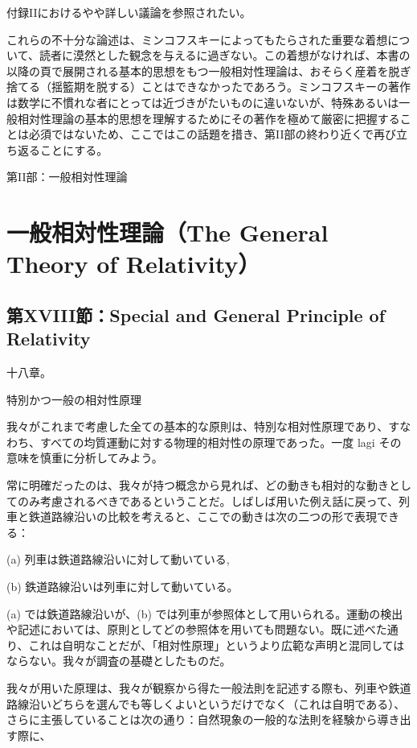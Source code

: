 \documentclass[a4paper,11pt,openany]{ltjsbook}
\begin{document}
 付録IIにおけるやや詳しい議論を参照されたい。

これらの不十分な論述は、ミンコフスキーによってもたらされた重要な着想について、読者に漠然とした観念を与えるに過ぎない。この着想がなければ、本書の以降の頁で展開される基本的思想をもつ一般相対性理論は、おそらく産着を脱ぎ捨てる（揺籃期を脱する）ことはできなかったであろう。ミンコフスキーの著作は数学に不慣れな者にとっては近づきがたいものに違いないが、特殊あるいは一般相対性理論の基本的思想を理解するためにその著作を極めて厳密に把握することは必須ではないため、ここではこの話題を措き、第II部の終わり近くで再び立ち返ることにする。

第II部：一般相対性理論


\clearpage
\part{一般相対性理論（The General Theory of Relativity）}



\clearpage
\chapter{第XVIII節：Special and General Principle of Relativity}

十八章。

特別かつ一般の相対性原理

我々がこれまで考慮した全ての基本的な原則は、特別な相対性原理であり、すなわち、すべての均質運動に対する物理的相対性の原理であった。一度 lagi その意味を慎重に分析してみよう。

常に明確だったのは、我々が持つ概念から見れば、どの動きも相対的な動きとしてのみ考慮されるべきであるということだ。しばしば用いた例え話に戻って、列車と鉄道路線沿いの比較を考えると、ここでの動きは次の二つの形で表現できる：

(a) 列車は鉄道路線沿いに対して動いている,

(b) 鉄道路線沿いは列車に対して動いている。

(a) では鉄道路線沿いが、(b) では列車が参照体として用いられる。運動の検出や記述においては、原則としてどの参照体を用いても問題ない。既に述べた通り、これは自明なことだが、「相対性原理」というより広範な声明と混同してはならない。我々が調査の基礎としたものだ。

我々が用いた原理は、我々が観察から得た一般法則を記述する際も、列車や鉄道路線沿いどちらを選んでも等しくよいというだけでなく（これは自明である）、さらに主張していることは次の通り：自然現象の一般的な法則を経験から導き出す際に、
\end{document}
